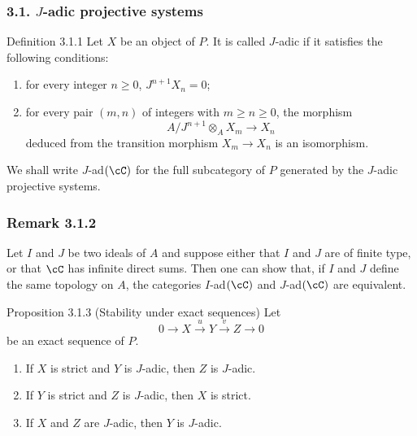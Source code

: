 \subsubsection*{3.1. $J$-adic projective systems}
\begin{statement}{Definition 3.1.1}
Let $X$ be an object of $P$. It is called $J$-adic if it satisfies the following conditions:
\begin{enumerate}[label=(\roman*)]
\item for every integer $n\ge0$, $J^{n+1}X_n=0$;
\item for every pair $(m,n)$ of integers with $m\ge n\ge0$, the morphism
\[
A/J^{n+1}\otimes_A X_m\longrightarrow X_n
\]
deduced from the transition morphism $X_m\to X_n$ is an isomorphism.
\end{enumerate}
\end{statement}
We shall write $J$-ad$(\cC)$ for the full subcategory of $P$ generated by the $J$-adic projective systems.

\subsubsection*{Remark 3.1.2}
Let $I$ and $J$ be two ideals of $A$ and suppose either that $I$ and $J$ are of finite type, or that $\cC$ has infinite direct sums. Then one can show that, if $I$ and $J$ define the same topology on $A$, the categories $I$-ad$(\cC)$ and $J$-ad$(\cC)$ are equivalent.

\begin{statement}{Proposition 3.1.3 (Stability under exact sequences)}
Let
\[
0\longrightarrow X\stackrel{u}{\longrightarrow}Y\stackrel{v}{\longrightarrow}Z\longrightarrow0
\]
be an exact sequence of $P$.
\begin{enumerate}[label=(\roman*)]
\item If $X$ is strict and $Y$ is $J$-adic, then $Z$ is $J$-adic.
\item If $Y$ is strict and $Z$ is $J$-adic, then $X$ is strict.
\item If $X$ and $Z$ are $J$-adic, then $Y$ is $J$-adic.
\end{enumerate}
\end{statement}

